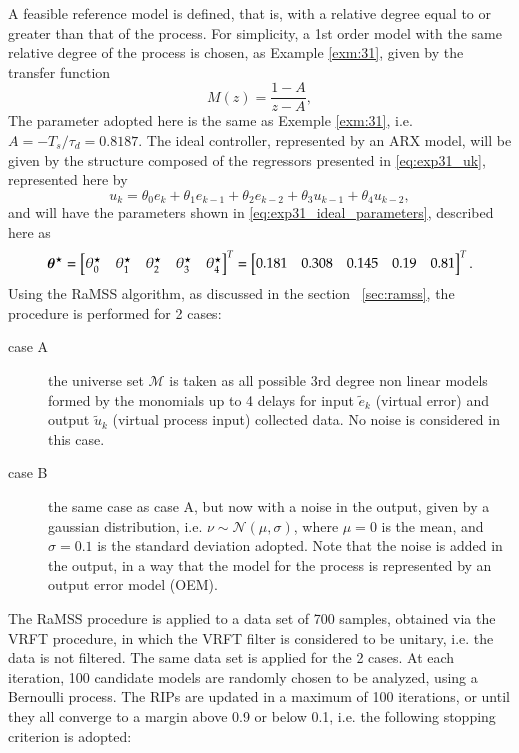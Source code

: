 \begin{exmp}
  A feasible reference model is defined, that is, with a relative degree equal to or greater than that of the process. For simplicity, a 1st order model with the same relative degree of the process is chosen, as Example \ref{exm:31}, given by the transfer function
  \begin{equation}
    M(z) = \frac{1-A}{z-A},
    \label{eq:mr_sis2aord}
  \end{equation}
  The parameter adopted here is the same as Exemple \ref{exm:31}, i.e. $A = -T_s/\tau_d = 0.8187$. 
  The ideal controller, represented by an ARX model, will be given by the structure composed of the regressors presented in \eqref{eq:exp31_uk}, represented here by
  \begin{equation}
    \label{eq:exp51_contIdeal}
    u_k = \theta_0e_{k} + \theta_1e_{k-1} + \theta_2e_{k-2} + \theta_3u_{k-1} + \theta_4u_{k-2},
  \end{equation}
  and will have the parameters shown in \eqref{eq:exp31_ideal_parameters}, described here as
  \begin{equation}
    \bm{\theta}^\star= \begin{bmatrix} \theta^\star_0 & \theta^\star_1 & \theta^\star_2 & \theta^\star_3 & \theta^\star_4 \end{bmatrix}^T =  \begin{bmatrix} 0.181 & 0.308 &  0.145 &  0.19 & 0.81 \end{bmatrix}^T.
  \label{eq:ex51_ideal_parameters}
\end{equation}
Using the RaMSS algorithm, as discussed in the section ~\ref{sec:ramss}, the procedure is performed for 2 cases:
\begin{description}
  \item[case A] the universe set $\mathscr{M}$ is taken as all possible 3rd degree non linear models formed by the monomials up to 4 delays for input $\tilde{e}_k$ (virtual error) and output $\tilde{u}_k$ (virtual process input) collected data. No noise is considered in this case.
  \item[case B] the same case as case A, but now with a noise in the output, given by a gaussian distribution, i.e. $\nu \sim \mathcal{N}(\mu,\sigma)$, where $\mu=0$ is the mean, and $\sigma= 0.1$ is the standard deviation adopted. Note that the noise is added in the output, in a way that the model for the process is represented by an output error model (OEM).
\end{description}
The RaMSS procedure is applied to a data set of 700 samples, obtained via the VRFT procedure, in which the VRFT filter is considered to be unitary, i.e. the data is not filtered. The same data set is applied for the 2 cases. At each iteration, 100 candidate models are randomly chosen to be analyzed, using a Bernoulli process. The RIPs are updated in a maximum of 100 iterations, or until they all converge to a margin above 0.9 or below 0.1, i.e. the following stopping criterion is adopted:

\end{exmp}
